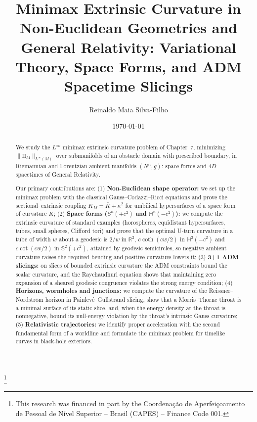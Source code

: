 \documentclass[11pt,reqno]{amsart}
\theoremstyle{definition}
\providecommand{\R}{\mathbb{R}}
\providecommand{\Hyp}{\mathbb{H}}
\providecommand{\Sph}{\mathbb{S}}
\providecommand{\II}{\mathrm{I\!I}}
\numberwithin{equation}{section}
\providecommand{\Hyp}{\mathbb{H}}
\providecommand{\Sph}{\mathbb{S}}
\providecommand{\II}{\mathrm{II}}
\providecommand{\R}{\mathbb{R}}
\begin{document}
\title[Minimax Curvature in Non-Euclidean Geometries and General Relativity]{Minimax Extrinsic Curvature in Non-Euclidean Geometries and General Relativity: Variational Theory, Space Forms, and ADM Spacetime Slicings}

\author{Reinaldo Maia Silva-Filho}
\address{Programa de P\'os-Gradua\c{c}\~ao em Estat\'istica e Experimenta\c{c}\~ao Agropecu\'aria (PPGEE/DES) \\
Universidade Federal de Lavras (UFLA), Lavras, MG, Brazil}
\thanks{This research was financed in part by the Coordena\c{c}\~ao de Aperfei\c{c}oamento de Pessoal de N\'ivel Superior -- Brasil (CAPES) -- Finance Code 001.}

\date{\today}

\begin{abstract}
We study the $L^\infty$ minimax extrinsic curvature problem of Chapter~7, minimizing $\|\II_M\|_{L^\infty(M)}$ over submanifolds of an obstacle domain with prescribed boundary, in Riemannian and Lorentzian ambient manifolds $(N^n, g)$: space forms and $4D$ spacetimes of General Relativity.

Our primary contributions are:
(1) \textbf{Non-Euclidean shape operator:} we set up the minimax problem with the classical Gauss--Codazzi--Ricci equations and prove the sectional--extrinsic coupling $K_M = \bar K + \kappa^2$ for umbilical hypersurfaces of a space form of curvature $\bar K$;
(2) \textbf{Space forms ($\Sph^n(+c^2)$ and $\Hyp^n(-c^2)$):} we compute the extrinsic curvature of standard examples (horospheres, equidistant hypersurfaces, tubes, small spheres, Clifford tori) and prove that the optimal U-turn curvature in a tube of width $w$ about a geodesic is $2/w$ in $\R^2$, $c\coth(cw/2)$ in $\Hyp^2(-c^2)$ and $c\cot(cw/2)$ in $\Sph^2(+c^2)$, attained by geodesic semicircles, so negative ambient curvature raises the required bending and positive curvature lowers it;
(3) \textbf{3+1 ADM slicings:} on slices of bounded extrinsic curvature the ADM constraints bound the scalar curvature, and the Raychaudhuri equation shows that maintaining zero expansion of a sheared geodesic congruence violates the strong energy condition;
(4) \textbf{Horizons, wormholes and junctions:} we compute the curvature of the Reissner--Nordstr\"om horizon in Painlev\'e--Gullstrand slicing, show that a Morris--Thorne throat is a minimal surface of its static slice, and, when the energy density at the throat is nonnegative, bound its null-energy violation by the throat's intrinsic Gauss curvature;
(5) \textbf{Relativistic trajectories:} we identify proper acceleration with the second fundamental form of a worldline and formulate the minimax problem for timelike curves in black-hole exteriors.
\end{abstract}
\end{document}
